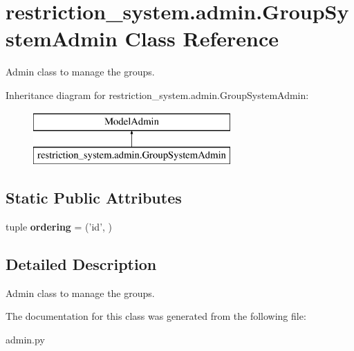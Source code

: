 \hypertarget{classrestriction__system_1_1admin_1_1GroupSystemAdmin}{}\section{restriction\+\_\+system.\+admin.\+Group\+System\+Admin Class Reference}
\label{classrestriction__system_1_1admin_1_1GroupSystemAdmin}


Admin class to manage the groups.  


Inheritance diagram for restriction\+\_\+system.\+admin.\+Group\+System\+Admin\+:\begin{figure}[H]
\begin{center}
\leavevmode
\includegraphics[height=2.000000cm]{classrestriction__system_1_1admin_1_1GroupSystemAdmin}
\end{center}
\end{figure}
\subsection*{Static Public Attributes}
\begin{DoxyCompactItemize}
\item 
\hypertarget{classrestriction__system_1_1admin_1_1GroupSystemAdmin_a0a7b851b92b81913c0ff0eca882267b6}{}tuple {\bfseries ordering} = ('id', )\label{classrestriction__system_1_1admin_1_1GroupSystemAdmin_a0a7b851b92b81913c0ff0eca882267b6}

\end{DoxyCompactItemize}


\subsection{Detailed Description}
Admin class to manage the groups. 



The documentation for this class was generated from the following file\+:\begin{DoxyCompactItemize}
\item 
admin.\+py\end{DoxyCompactItemize}
